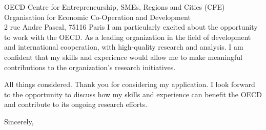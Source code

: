 \documentclass[11pt]{letter}
\begin{document}
\begin{letter}{OECD Centre for Entrepreneurship, SMEs, Regions and Cities (CFE) \\
Organisation for Economic Co-Operation and Development \\
2 rue Andre Pascal, 75116 Paris}
I am particularly excited about the opportunity to work with the OECD. As a leading organization in the field of development and international cooperation, with high-quality research and analysis. I am confident that my skills and experience would allow me to make meaningful contributions to the organization's research initiatives.

All things considered. Thank you for considering my application. I look forward to the opportunity to discuss how my skills and experience can benefit the OECD and contribute to its ongoing research efforts. 

\closing{Sincerely,}
\end{letter}
\end{document}
